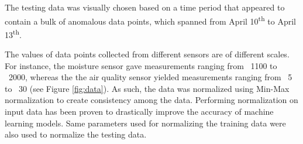 The testing data was visually chosen based on a time period that appeared to contain a bulk of anomalous data points, which spanned from April 10\textsuperscript{th} to April 13\textsuperscript{th}.



The values of data points collected from different sensors are of different scales. For instance, the moisture sensor gave measurements ranging from ~1100 to ~2000, whereas the the air quality sensor yielded measurements ranging from ~5 to ~30 (see Figure \ref{fig:data}). As such, the data was normalized using Min-Max normalization \cite{patro2015normalization} to create consistency among the data. Performing normalization on input data has been proven to drastically improve the accuracy of machine learning models. Same parameters used for normalizing the training data were also used to normalize the testing data.



